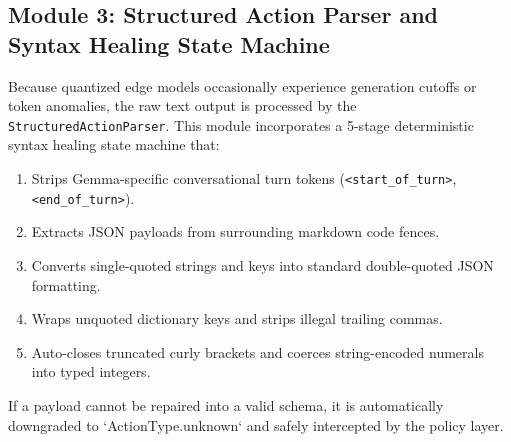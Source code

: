 \subsection{Module 3: Structured Action Parser and Syntax Healing State Machine}
Because quantized edge models occasionally experience generation cutoffs or token anomalies, the raw text output is processed by the \texttt{StructuredActionParser}. This module incorporates a 5-stage deterministic syntax healing state machine that:
\begin{enumerate}
    \item Strips Gemma-specific conversational turn tokens (\texttt{<start\_of\_turn>}, \texttt{<end\_of\_turn>}).
    \item Extracts JSON payloads from surrounding markdown code fences.
    \item Converts single-quoted strings and keys into standard double-quoted JSON formatting.
    \item Wraps unquoted dictionary keys and strips illegal trailing commas.
    \item Auto-closes truncated curly brackets and coerces string-encoded numerals into typed integers.
\end{enumerate}
If a payload cannot be repaired into a valid schema, it is automatically downgraded to `ActionType.unknown` and safely intercepted by the policy layer.

